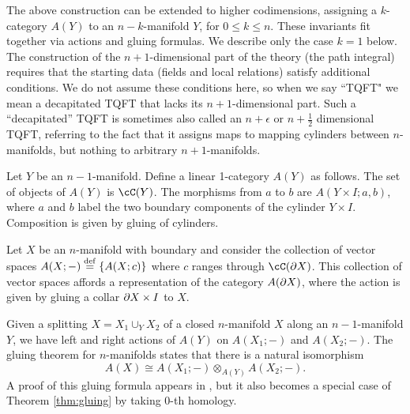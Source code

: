 The above construction can be extended to higher codimensions, assigning
a $k$-category $A(Y)$ to an $n{-}k$-manifold $Y$, for $0 \le k \le n$.
These invariants fit together via actions and gluing formulas.
We describe only the case $k=1$ below.
The construction of the $n{+}1$-dimensional part of the theory (the path integral) 
requires that the starting data (fields and local relations) satisfy additional
conditions.
We do not assume these conditions here, so when we say ``TQFT" we mean a decapitated TQFT
that lacks its $n{+}1$-dimensional part. 
Such a ``decapitated'' TQFT is sometimes also called an $n+\epsilon$ or 
$n+\frac{1}{2}$ dimensional TQFT, referring to the fact that it assigns maps to 
mapping cylinders between $n$-manifolds, but nothing to arbitrary $n{+}1$-manifolds.

Let $Y$ be an $n{-}1$-manifold.
Define a linear 1-category $A(Y)$ as follows.
The set of objects of $A(Y)$ is $\cC(Y)$.
The morphisms from $a$ to $b$ are $A(Y\times I; a, b)$, 
where $a$ and $b$ label the two boundary components of the cylinder $Y\times I$.
Composition is given by gluing of cylinders.

Let $X$ be an $n$-manifold with boundary and consider the collection of vector spaces
$A(X; -) \stackrel{\mathrm{def}}{=} \{A(X; c)\}$ where $c$ ranges through $\cC(\bd X)$.
This collection of vector spaces affords a representation of the category $A(\partial X)$, where
the action is given by gluing a collar $\partial X\times I$ to $X$.

Given a splitting $X = X_1 \cup_Y X_2$ of a closed $n$-manifold $X$ along an $n{-}1$-manifold $Y$,
we have left and right actions of $A(Y)$ on $A(X_1; -)$ and $A(X_2; -)$.
The gluing theorem for $n$-manifolds states that there is a natural isomorphism
\[
	A(X) \cong A(X_1; -) \otimes_{A(Y)} A(X_2; -) .
\]
A proof of this gluing formula appears in \cite{kw:tqft}, but it also becomes a 
special case of Theorem \ref{thm:gluing} by taking $0$-th homology.
